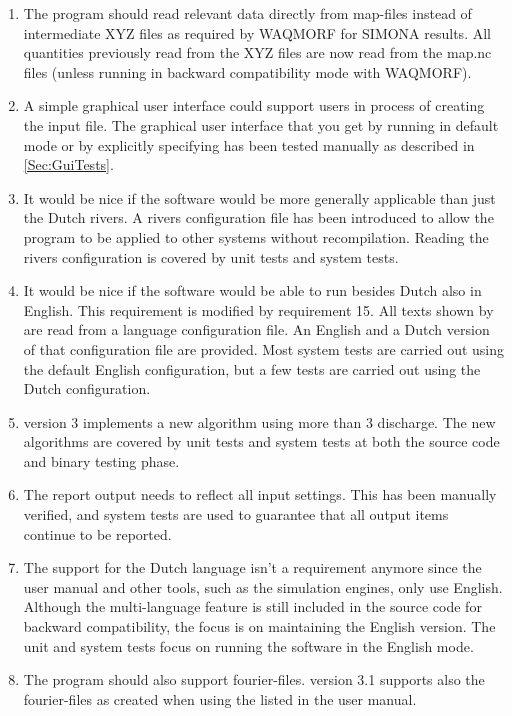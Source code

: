 \begin{enumerate}
\item The program should read relevant data directly from \dflowfm map-files instead of intermediate XYZ files as required by WAQMORF for SIMONA results.
All quantities previously read from the XYZ files are now read from the \dflowfm map.nc files (unless running in backward compatibility mode with WAQMORF).

\item A simple graphical user interface could support users in process of creating the input file.
The graphical user interface that you get by running \dfastmi in default mode or by explicitly specifying  has been tested manually as described in \autoref{Sec:GuiTests}.

\item It would be nice if the software would be more generally applicable than just the Dutch rivers.
A rivers configuration file has been introduced to allow the program to be applied to other systems without recompilation.
Reading the rivers configuration is covered by unit tests and system tests.

\item It would be nice if the software would be able to run besides Dutch also in English.
This requirement is modified by requirement 15.
All texts shown by \dfastmi are read from a language configuration file.
An English and a Dutch version of that configuration file are provided.
Most system tests are carried out using the default English configuration, but a few tests are carried out using the Dutch configuration.

\item \dfastmi version 3 implements a new algorithm using more than 3 discharge.
The new algorithms are covered by unit tests and system tests at both the source code and binary testing phase.

\item The report output needs to reflect all input settings.
This has been manually verified, and system tests are used to guarantee that all output items continue to be reported.

\item The support for the Dutch language isn’t a requirement anymore since the user manual and other tools, such as the simulation engines, only use English.
Although the multi-language feature is still included in the source code for backward compatibility, the focus is on maintaining the English version.
The unit and system tests focus on running the software in the English mode.

\item The program should also support \dflowfm fourier-files.
\dfastmi version 3.1 supports also the \dflowfm fourier-files as created when using the  listed in the user manual.
\end{enumerate}


